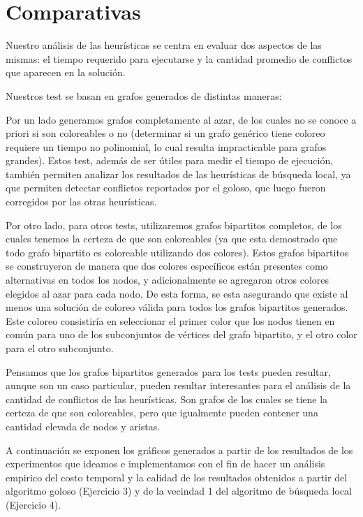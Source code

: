 \section{Comparativas}
Nuestro análisis de las heurísticas se centra en evaluar dos aspectos de las mismas: el tiempo requerido para ejecutarse y la cantidad promedio de conflictos que aparecen en la solución.


Nuestros test se basan en grafos generados de distintas maneras:

Por un lado generamos grafos completamente al azar, de los cuales no se conoce a priori si son coloreables o no (determinar si un grafo genérico tiene coloreo requiere un tiempo no polinomial, lo cual resulta impracticable para grafos grandes). Estos test, además de ser útiles para medir el tiempo de ejecución, también permiten analizar los resultados de las heurísticas de búsqueda local, ya que permiten detectar conflictos reportados por el goloso, que luego fueron corregidos por las otras heurísticas.

Por otro lado, para otros tests, utilizaremos grafos bipartitos completos, de los cuales tenemos la certeza de que son coloreables (ya que esta demostrado que todo grafo bipartito es coloreable utilizando dos colores). Estos grafos bipartitos se construyeron de manera que dos colores específicos están presentes como alternativas en todos los nodos,  y adicionalmente se agregaron otros colores elegidos al azar para cada nodo. De esta forma, se esta asegurando que existe al menos una solución de coloreo válida para todos los grafos bipartitos generados. Este coloreo consistiría en seleccionar el primer color que los nodos tienen en común para uno de los subconjuntos de vértices del grafo bipartito, y el otro color para el otro subconjunto.

Pensamos que los grafos bipartitos generados para los tests pueden resultar, aunque son un caso particular, pueden resultar interesantes para el análisis de la cantidad de conflictos de las heurísticas. Son grafos de los cuales se tiene la certeza de que son coloreables, pero que igualmente pueden contener una cantidad elevada de nodos y aristas.

A continuación se exponen los gráficos generados a partir de los resultados de los experimentos que ideamos e implementamos con el fin de hacer un análisis empirico del costo temporal y la calidad de los resultados obtenidos a partir del algoritmo goloso (Ejercicio 3) y de la vecindad 1 del algoritmo de búsqueda local (Ejercicio 4). 

